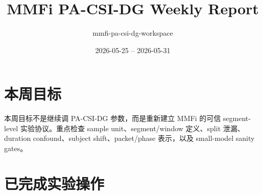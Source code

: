 \documentclass[UTF8,11pt]{ctexart}
\title{\textbf{MMFi PA-CSI-DG Weekly Report}}
\author{mmfi-pa-csi-dg-workspace}
\date{2026-05-25 -- 2026-05-31}
\begin{document}
\maketitle

\section{本周目标}

本周目标不是继续调 PA-CSI-DG 参数，而是重新建立 MMFi 的可信 segment-level 实验协议。重点检查 sample unit、segment/window 定义、split 泄漏、duration confound、subject shift、packet/phase 表示，以及 small-model sanity gates。

\section{已完成实验操作}
\end{document}
